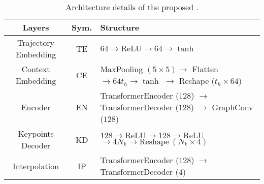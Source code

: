 \documentclass[../paper.tex]{subfiles}
\begin{document}
\begin{table}[bp]
    \renewcommand{\arraystretch}{1.3}
    \caption{
        Architecture details of the proposed \MODEL.
    }
    \label{tab_method}
    \centering
    \begin{tabular}{c|c|l}
        \hline
        Layers & Sym. & Structure \\
        
        \hline
        Trajectory Embedding & TE & $64 \to \mbox{ReLU} \to 64 \to \tanh$ \\

        \hline
        Context Embedding & CE & \makecell[l]{
            MaxPooling $(5 \times 5) \to$ Flatten \\
            $\to 64t_h \to \tanh$ \\
            $\to$ Reshape ($t_h \times 64$)
        }\\

        \hline
        Encoder & EN & \makecell[l]{
            TransformerEncoder ($128$) $\to$ \\
            TransformerDecoder ($128$) $\to$ \\
            GraphConv ($128$)
        }\\

        \hline
        Keypoints Decoder & KD & \makecell[l]{
            $128 \to \mbox{ReLU} \to 128 \to \mbox{ReLU}$ \\
            $\to 4N_k \to \mbox{Reshape}~(N_k \times 4)$
        }\\

        \hline
        Interpolation & IP & \makecell[l]{
            TransformerEncoder ($128$) $\to$ \\
            TransformerDecoder ($4$)
        }\\
        
        
        \hline
    \end{tabular}
\end{table}
\end{document}
